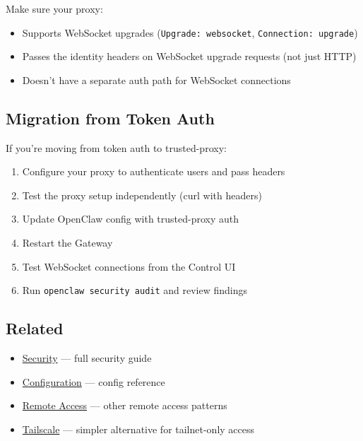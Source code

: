 Make sure your proxy:

\begin{itemize}
  \item Supports WebSocket upgrades (\texttt{Upgrade: websocket}, \texttt{Connection: upgrade})
  \item Passes the identity headers on WebSocket upgrade requests (not just HTTP)
  \item Doesn't have a separate auth path for WebSocket connections
\end{itemize}


\subsection{Migration from Token Auth}


If you're moving from token auth to trusted-proxy:

\begin{enumerate}
  \item Configure your proxy to authenticate users and pass headers
  \item Test the proxy setup independently (curl with headers)
  \item Update OpenClaw config with trusted-proxy auth
  \item Restart the Gateway
  \item Test WebSocket connections from the Control UI
  \item Run \texttt{openclaw security audit} and review findings
\end{enumerate}


\subsection{Related}


\begin{itemize}
  \item \href{/gateway/security}{Security} — full security guide
  \item \href{/gateway/configuration}{Configuration} — config reference
  \item \href{/gateway/remote}{Remote Access} — other remote access patterns
  \item \href{/gateway/tailscale}{Tailscale} — simpler alternative for tailnet-only access
\end{itemize}



\clearpage

